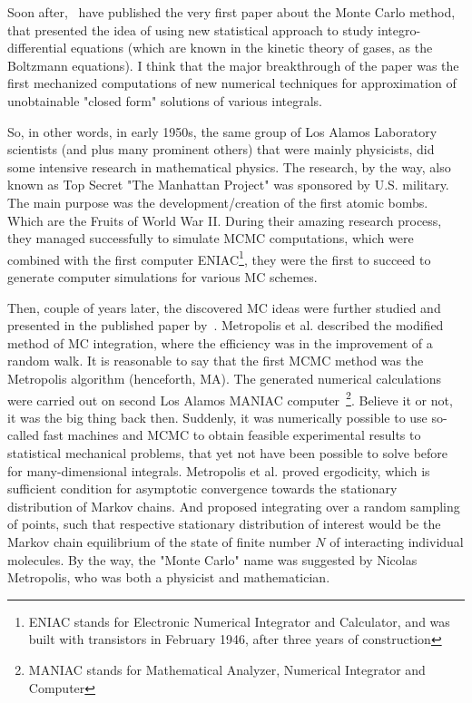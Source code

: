 \documentclass[a4paper,11pt,english]{article}
\begin{document}
		Soon after,~\citep{ulam} have published the very first paper about the Monte Carlo method, that presented the idea of using new statistical 
		approach to study integro-differential equations (which are known in the kinetic theory of gases, as the Boltzmann equations). I think that the 
		major breakthrough of the paper was the first mechanized computations of new numerical techniques for approximation of unobtainable "closed form" 
		solutions of various integrals. 
		
		So, in other words, in early 1950s, the same group of Los Alamos Laboratory scientists (and plus many prominent others) that were mainly 
		physicists, did some intensive research in mathematical physics. The research, by the way, also known as Top Secret "The Manhattan Project" 
		was sponsored by U.S. military. The main purpose was the development/creation of the first atomic bombs. Which are the Fruits of World War II. 
		During their amazing research process, they managed successfully to simulate MCMC computations, which were combined with the first computer 
		ENIAC\footnote{ENIAC stands for Electronic Numerical Integrator and Calculator, and was built with transistors in February 1946, after three 
		years of construction}, they were the first to succeed to generate computer simulations for various MC schemes. 
		 		
		Then, couple of years later, the discovered MC ideas were further studied and presented in the published paper by~\cite{metropolis}. Metropolis 
		et al. described the modified method of MC integration, where the efficiency was in the improvement of a random walk. It is reasonable to say 
		that the first MCMC method was the Metropolis algorithm (henceforth, MA). The generated numerical calculations were carried out on second Los 
		Alamos MANIAC computer~\footnote{MANIAC stands for Mathematical Analyzer, Numerical Integrator and Computer}. Believe it or not, it was the big 
		thing back then. Suddenly, it was numerically possible to use so-called fast machines and MCMC to obtain feasible experimental results to 
		statistical mechanical problems, that yet not have been possible to solve before for many-dimensional integrals. Metropolis et al. proved 
		ergodicity, which is sufficient condition for asymptotic convergence towards the stationary distribution of Markov chains. And proposed 
		integrating over a random sampling of points, such that respective stationary distribution of interest would be the Markov chain equilibrium of 
		the state of finite number $N$ of interacting individual molecules. By the way, the "Monte Carlo" name was suggested by Nicolas Metropolis, who 
		was both a physicist and mathematician.  
\end{document}
